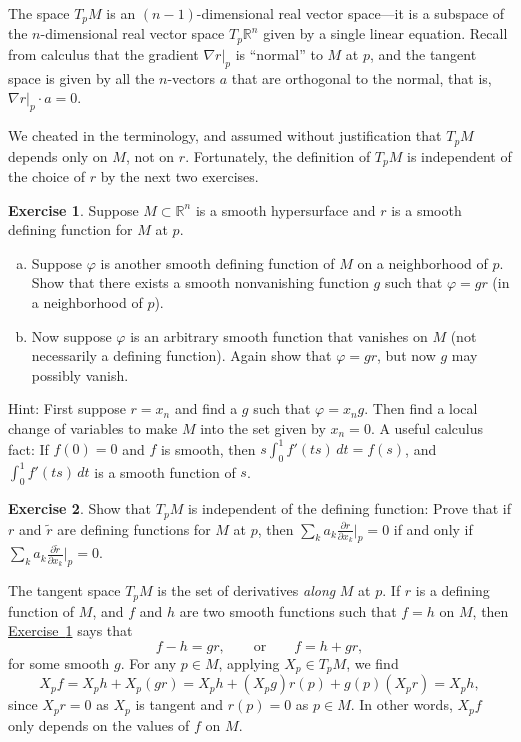 \documentclass[12pt,openany]{book}
\newcommand{\R}{{\mathbb{R}}}
\theoremstyle{plain}
\theoremstyle{remark}
\theoremstyle{definition}
\newenvironment{exbox}{%
    \def\FrameCommand{\vrule width 1pt \relax\hspace{10pt}}%
    \MakeFramed{\advance\hsize-\width\FrameRestore}%
}{%
    \endMakeFramed
}
\newenvironment{exparts}{%
    \leavevmode\begin{enumerate}[a),noitemsep,topsep=0pt,parsep=0pt,partopsep=0pt]
}{%
    \end{enumerate}
}
\theoremstyle{exercise}
\newtheorem{exercise}{Exercise}[section]
\theoremstyle{example}
\newcommand{\exerciseref}[1]{\hyperref[#1]{Exercise~\ref*{#1}}}
\begin{document}
The space $T_pM$ is an $(n-1)$-dimensional real vector space---it is a subspace
of the $n$-dimensional real vector space $T_p\R^n$ given by a single linear equation.
Recall from calculus that the gradient $\nabla r|_p$ is
``normal'' to $M$ at $p$, and
the tangent space is given by all the $n$-vectors $a$
that are orthogonal to the normal, that is, $\nabla r|_p \cdot a = 0$.

\pagebreak[1]
We cheated in the terminology, and assumed without justification that $T_pM$
depends only on $M$, not on $r$.
Fortunately, the definition of $T_pM$ is independent of the choice of $r$ by the next two
exercises.

\begin{exbox}
\begin{exercise} \label{exercise:smoothdivision}
Suppose $M \subset \R^n$ is a smooth hypersurface and
$r$ is a smooth defining function for $M$ at $p$.
\begin{exparts}
\item
Suppose $\varphi$ is another
smooth defining function of $M$ on a neighborhood of $p$.
Show that there exists a smooth nonvanishing function $g$ such that
$\varphi = g r$ (in a neighborhood of $p$).
\item
Now suppose $\varphi$ is an arbitrary smooth function that vanishes on $M$ (not
necessarily a defining function).
Again show that $\varphi = g r$, but now $g$ may possibly vanish.
\end{exparts}
\nopagebreak
Hint: First suppose $r=x_n$ and
find a $g$ such that $\varphi = x_n g$.  Then find
a local change of variables to make $M$ into the set given by $x_n = 0$.
A useful calculus fact:
If $f(0) = 0$ and $f$ is smooth, then
$s \int_0^1 f'(ts) \,dt = f(s)$,
and $\int_0^1 f'(ts) \,dt$ is a smooth function of $s$.
\end{exercise}

\begin{exercise}
Show that $T_pM$ is independent of the defining function:
Prove that if $r$ and $\tilde{r}$ are defining functions for $M$ at $p$, then
$\sum_k a_k \frac{\partial r}{\partial x_k} \big|_p = 0$
if and only if
$\sum_k a_k \frac{\partial \tilde{r}}{\partial x_k} \big|_p = 0$.
\end{exercise}
\end{exbox}

The tangent space $T_p M$ is the set of derivatives
\emph{along} $M$ at $p$.  If $r$ is a defining function of $M$, and $f$ and $h$
are two smooth functions such that $f=h$ on $M$, then
\exerciseref{exercise:smoothdivision}
says that
\begin{equation*}
f-h = g r, \qquad \text{or} \qquad
f = h + g r,
\end{equation*}
for some smooth $g$.  For any $p \in M$, applying $X_p \in T_pM$, we find
\begin{equation*}
X_p f =
X_p h + X_p (gr) =
X_p h + (X_p g)r(p) + g(p)(X_p r) =
X_p h,
\end{equation*}
since $X_p r = 0$ as $X_p$ is tangent and $r(p) = 0$ as $p \in M$.
In other words, $X_p f$ only
depends on the values of $f$ on $M$.
\end{document}
